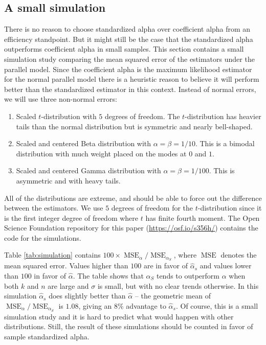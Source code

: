\documentclass[twoside]{article}
\DeclareMathOperator{\MSE}{MSE}
\begin{document}
\subsection{A small simulation}
There is no reason to choose standardized alpha over coefficient alpha from an efficiency standpoint. But it might still be the case
that the standardized alpha outperforms coefficient alpha
in small samples. This section contains a small simulation
study comparing the mean squared error of the estimators under
the parallel model. Since the coefficient alpha is the maximum likelihood
estimator for the normal parallel model there is a heuristic reason
to believe it will perform better than the standardized estimator
in this context. Instead of normal errors, we will use three non-normal
errors:

\begin{enumerate}
\item Scaled $t$-distribution with $5$ degrees of freedom. The $t$-distribution
has heavier tails than the normal distribution but is symmetric and nearly bell-shaped. 
\item Scaled and centered Beta distribution with $\alpha=\beta=1/10$. This is a bimodal distribution with much weight placed on the modes at $0$ and $1$. 
\item Scaled and centered Gamma distribution with $\alpha=\beta=1/100$. This is asymmetric and with heavy tails. 
\end{enumerate}

All of the distributions are extreme, and should be able to force out the difference between the estimators. We use $5$ degrees of freedom for the $t$-distribution since it is the first integer degree of freedom where $t$ has finite fourth moment. The Open Science Foundation repository for this paper (\url{https://osf.io/s356h/}) contains the code for the simulations.

Table \ref{tab:simulation} contains $100 \times \MSE_\alpha/\MSE_{\alpha_S}$, where $\MSE$ denotes the mean squared error. Values higher than $100$ are in favor of $\hat{\alpha}_s$ and values lower than $100$ in favor of $\hat{\alpha}$. The table shows that $\alpha_S$ tends to outperform $\alpha$ when both $k$ and $n$ are large and $\sigma$ is small, but with no clear trends otherwise. In this simulation $\hat{\alpha}_s$ does slightly better than $\hat{\alpha}$ -- the geometric mean of $\MSE_\alpha/\MSE_{\alpha_S}$ is $1.08$, giving an $8$\% advantage to $\hat{\alpha}_s$. Of course, this is a small simulation study and it is hard to predict what would happen with other distributions. Still, the result of these simulations should be counted in favor of sample standardized alpha.
\end{document}
